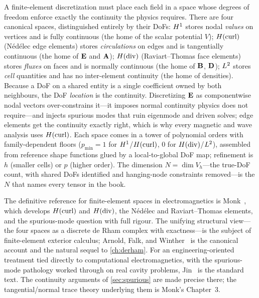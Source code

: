 \summarysection
A finite-element discretization must place each field in a space whose degrees of freedom enforce
exactly the continuity the physics requires. There are four canonical spaces, distinguished entirely by
their DoFs: $H^1$ stores nodal \emph{values} on vertices and is fully continuous (the home of the
scalar potential $V$); $H(\mathrm{curl})$ (N\'ed\'elec edge elements) stores \emph{circulations} on edges and is
tangentially continuous (the home of $\mathbf{E}$ and $\mathbf{A}$); $H(\mathrm{div})$ (Raviart--Thomas face elements) stores
\emph{fluxes} on faces and is normally continuous (the home of $\mathbf{B}$, $\mathbf{D}$); $L^2$ stores
\emph{cell} quantities and has no inter-element continuity (the home of densities). Because a DoF on a
shared entity is a single coefficient owned by both neighbours, the DoF \emph{location} is the
continuity. Discretizing $\mathbf{E}$ as componentwise nodal vectors over-constrains it---it imposes normal
continuity physics does not require---and injects spurious modes that ruin eigenmode and driven solves;
edge elements get the continuity exactly right, which is why every magnetic and wave analysis uses
$H(\mathrm{curl})$. Each space comes in a tower of polynomial orders with family-dependent floors
($p_{\min}=1$ for $H^1$/$H(\mathrm{curl})$, $0$ for $H(\mathrm{div})$/$L^2$), assembled from reference shape functions
glued by a local-to-global DoF map; refinement is $h$ (smaller cells) or $p$ (higher order). The
dimension $N=\dim V_h$---the true-DoF count, with shared DoFs identified and hanging-node constraints
removed---is the $N$ that names every tensor in the book.

\furtherreading
The definitive reference for finite-element spaces in electromagnetics is
Monk~\citep{monk2003}, which develops $H(\mathrm{curl})$ and $H(\mathrm{div})$, the N\'ed\'elec and Raviart--Thomas
elements, and the spurious-mode question with full rigour. The unifying structural view---the four
spaces as a discrete de Rham complex with exactness---is the subject of finite-element exterior
calculus; Arnold, Falk, and Winther~\citep{arnold2006feec} is the canonical account and the natural
sequel to \cref{ch:derham}. For an engineering-oriented treatment tied directly to computational
electromagnetics, with the spurious-mode pathology worked through on real cavity problems,
Jin~\citep{jin2014} is the standard text. The continuity arguments of \cref{sec:spurious} are made
precise there; the tangential/normal trace theory underlying them is Monk's Chapter~3.

